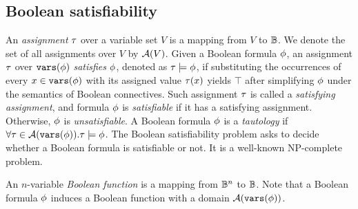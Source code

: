 \subsection{Boolean satisfiability}
An \textit{assignment} $\tau$ over a variable set $V$ is a mapping from $V$ to $\mathbb{B}$.
We denote the set of all assignments over $V$ by $\mathcal{A}(V)$.
Given a Boolean formula $\phi$, an assignment $\tau$ over $\mathtt{vars}(\phi)$ \textit{satisfies} $\phi$,
denoted as $\tau\models\phi$,
if substituting the occurrences of every $x\in\mathtt{vars}(\phi)$ with its assigned value $\tau(x)$ yields $\top$
after simplifying $\phi$ under the semantics of Boolean connectives.
Such assignment $\tau$ is called a \textit{satisfying assignment},
and formula $\phi$ is \textit{satisfiable} if it has a satisfying assignment.
Otherwise, $\phi$ is \textit{unsatisfiable}.
A Boolean formula $\phi$ is a \textit{tautology} if $\forall\tau\in\mathcal{A}(\mathtt{vars}(\phi)).\tau\models\phi$.
The Boolean satisfiability problem asks to decide whether a Boolean formula is satisfiable or not.
It is a well-known NP-complete~\cite{Cook1971} problem.

An $n$-variable \textit{Boolean function} is a mapping from $\mathbb{B}^n$ to $\mathbb{B}$.
Note that a Boolean formula $\phi$ induces a Boolean function with a domain $\mathcal{A}(\mathtt{vars}(\phi))$.
